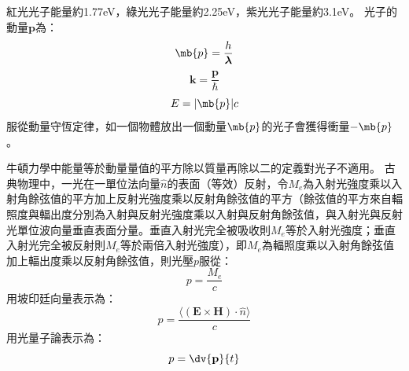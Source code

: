 \documentclass[a4paper,12pt]{article}
\begin{document}
紅光光子能量約1.77eV，綠光光子能量約2.25eV，紫光光子能量約3.1eV。
光子的動量$\mathbf{p}$為：
\[\mb{p}=\frac{h}{\boldsymbol{\lambda}}\]
\[\mathbf{k}=\frac{\mathbf{p}}{\hbar}\]
\[E=|\mb{p}|c\]
服從動量守恆定律，如一個物體放出一個動量$\mb{p}$的光子會獲得衝量$-\mb{p}$。

牛頓力學中能量等於動量量值的平方除以質量再除以二的定義對光子不適用。
古典物理中，一光在一單位法向量$\hat{n}$的表面（等效）反射，令$M_e$為入射光強度乘以入射角餘弦值的平方加上反射光強度乘以反射角餘弦值的平方（餘弦值的平方來自輻照度與輻出度分別為入射與反射光強度乘以入射與反射角餘弦值，與入射光與反射光單位波向量垂直表面分量。垂直入射光完全被吸收則$M_e$等於入射光強度；垂直入射光完全被反射則$M_e$等於兩倍入射光強度），即$M_e$為輻照度乘以入射角餘弦值加上輻出度乘以反射角餘弦值，則光壓$p$服從：
\[p=\frac{M_e}{c}\]
用坡印廷向量表示為：
\[p=\frac{\langle(\mathbf{E}\times\mathbf{H})\cdot\hat{n}\rangle}{c}\]
用光量子論表示為：
\[p=\dv{\mathbf{p}}{t}\]
\end{document}
